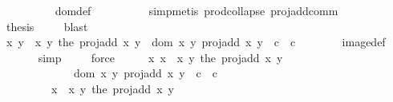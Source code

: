 \begin{isabellebody}
\ \ \ \ \ \ \ \ \isamarkupfalse%
\ dom{\isacharunderscore}def\ \isanewline
\ \ \ \ \ \ \ \ \isamarkupfalse%
{\isacharparenleft}simp{\isacharcomma}metis\ prod{\isachardot}collapse\ proj{\isacharunderscore}add{\isacharunderscore}comm{\isacharparenright}\isanewline
\ \ \ \ \ \ \isamarkupfalse%
\ \isamarkupfalse%
\ {\isacharquery}thesis\ \isamarkupfalse%
\ {}\ \isamarkupfalse%
\ blast\isanewline
\ \ \ \ \isamarkupfalse%
\ \ \ \ \ \ \ \ \isanewline
\ \ \ \ \isamarkupfalse%
\ \isamarkupfalse%
\ {\isachardoublequoteopen}{\isacharparenleft}x{\isacharcomma}\ y{\isacharparenright}\ {\isasymin}\ {\isacharparenleft}{\isasymlambda}{\isacharparenleft}x{\isacharcomma}\ y{\isacharparenright}{\isachardot}\ the\ {\isacharparenleft}proj{\isacharunderscore}add\ x\ y{\isacharparenright}{\isacharparenright}\ {\isacharbackquote}\ {\isacharparenleft}dom\ {\isacharparenleft}{\isasymlambda}{\isacharparenleft}x{\isacharcomma}\ y{\isacharparenright}{\isachardot}\ proj{\isacharunderscore}add\ x\ y{\isacharparenright}\ {\isasyminter}\ c{}\ {\isasymtimes}\ c{}{\isacharparenright}{\isachardoublequoteclose}\isanewline
\ \ \ \ \ \ \isamarkupfalse%
\ image{\isacharunderscore}def\ \isanewline
\ \ \ \ \ \ \isamarkupfalse%
{\isacharparenleft}simp{\isacharparenright}\ \isamarkupfalse%
\ {\isachardoublequoteopen}{}{\isachardoublequoteclose}\ \isamarkupfalse%
\ force\isacommand{{\isacharbraceright}}\isamarkupfalse%
\isanewline
\ \ \isamarkupfalse%
\ \isamarkupfalse%
\ {\isachardoublequoteopen}{\isasymAnd}x{\isachardot}\ x\ {\isasymin}\ {\isacharparenleft}{\isasymlambda}{\isacharparenleft}x{\isacharcomma}\ y{\isacharparenright}{\isachardot}\ the\ {\isacharparenleft}proj{\isacharunderscore}add\ x\ y{\isacharparenright}{\isacharparenright}\ {\isacharbackquote}\isanewline
\ \ \ \ \ \ \ \ \ \ \ \ \ {\isacharparenleft}dom\ {\isacharparenleft}{\isasymlambda}{\isacharparenleft}x{\isacharcomma}\ y{\isacharparenright}{\isachardot}\ proj{\isacharunderscore}add\ x\ y{\isacharparenright}\ {\isasyminter}\ c{}\ {\isasymtimes}\ c{}{\isacharparenright}\ {\isasymLongrightarrow}\isanewline
\ \ \ \ \ \ \ \ \ x\ {\isasymin}\ {\isacharparenleft}{\isasymlambda}{\isacharparenleft}x{\isacharcomma}\ y{\isacharparenright}{\isachardot}\ the\ {\isacharparenleft}proj{\isacharunderscore}add\ x\ y{\isacharparenright}{\isacharparenright}\ {\isacharbackquote}\isanewline

\end{isabellebody}
